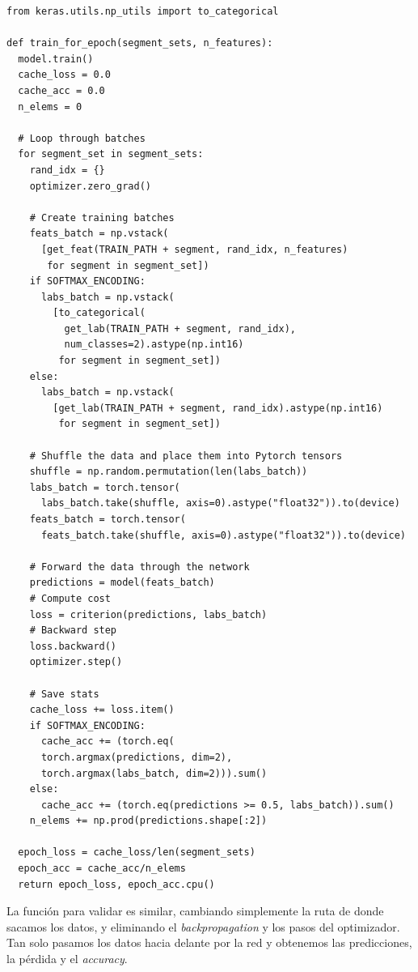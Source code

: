 \documentclass[11pt]{article}
\begin{document}
\begin{verbatim}
from keras.utils.np_utils import to_categorical

def train_for_epoch(segment_sets, n_features):
  model.train()
  cache_loss = 0.0
  cache_acc = 0.0
  n_elems = 0

  # Loop through batches
  for segment_set in segment_sets:
    rand_idx = {}
    optimizer.zero_grad()

    # Create training batches
    feats_batch = np.vstack(
      [get_feat(TRAIN_PATH + segment, rand_idx, n_features)
       for segment in segment_set])
    if SOFTMAX_ENCODING:
      labs_batch = np.vstack(
        [to_categorical(
          get_lab(TRAIN_PATH + segment, rand_idx),
          num_classes=2).astype(np.int16)
         for segment in segment_set])
    else:
      labs_batch = np.vstack(
        [get_lab(TRAIN_PATH + segment, rand_idx).astype(np.int16)
         for segment in segment_set])

    # Shuffle the data and place them into Pytorch tensors
    shuffle = np.random.permutation(len(labs_batch))
    labs_batch = torch.tensor(
      labs_batch.take(shuffle, axis=0).astype("float32")).to(device)
    feats_batch = torch.tensor(
      feats_batch.take(shuffle, axis=0).astype("float32")).to(device)

    # Forward the data through the network
    predictions = model(feats_batch)
    # Compute cost
    loss = criterion(predictions, labs_batch)
    # Backward step
    loss.backward()
    optimizer.step()

    # Save stats
    cache_loss += loss.item()
    if SOFTMAX_ENCODING:
      cache_acc += (torch.eq(
      torch.argmax(predictions, dim=2),
      torch.argmax(labs_batch, dim=2))).sum()
    else:
      cache_acc += (torch.eq(predictions >= 0.5, labs_batch)).sum()
    n_elems += np.prod(predictions.shape[:2])

  epoch_loss = cache_loss/len(segment_sets)
  epoch_acc = cache_acc/n_elems
  return epoch_loss, epoch_acc.cpu()
\end{verbatim}

La función para validar es similar, cambiando simplemente la ruta de donde sacamos los datos, y eliminando el \textit{backpropagation} y los pasos del optimizador. Tan solo pasamos los datos hacia delante por la red y obtenemos las predicciones, la pérdida y el \textit{accuracy}.
\end{document}
